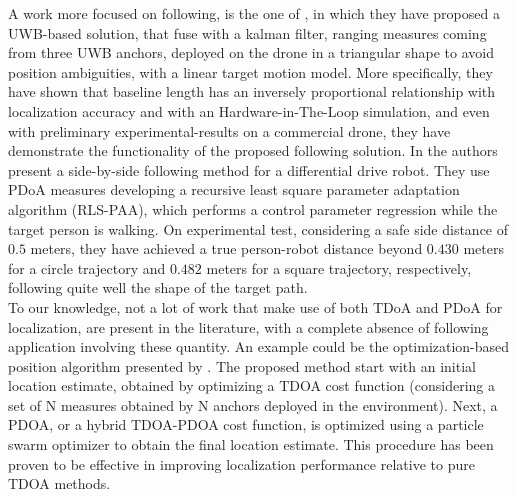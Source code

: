 A work more focused on following, is the one of \citet{Uwbbasedsol}, in which they have proposed a UWB-based solution, that fuse with a kalman filter, ranging measures coming from three UWB anchors, deployed on the drone in a triangular shape to avoid position ambiguities, with a linear target motion model. More specifically, they have shown that baseline length has an inversely proportional relationship with localization accuracy and with an Hardware-in-The-Loop simulation, and even with preliminary experimental-results on a commercial drone, they have demonstrate the functionality of the proposed following solution. In \cite{sidebyside} the authors present a side-by-side following method for a differential drive robot. They use PDoA measures developing a recursive least square parameter adaptation algorithm (RLS-PAA), which performs a control parameter regression while the target person is walking. On experimental test, considering a safe side distance of $0.5$ meters, they have achieved a true person-robot distance beyond $0.430$ meters for a circle trajectory and $0.482$ meters for a square trajectory, respectively, following quite well the shape of the target path.\\
To our knowledge, not a lot of work that make use of both TDoA and PDoA for localization, are present in the literature, with a complete absence of following application involving these quantity. An example could be the optimization-based position algorithm presented by \citet{tdoapdoa_optim}. The proposed method start with an initial location estimate, obtained by optimizing a TDOA cost function (considering a set of N measures obtained by N anchors deployed in the environment). Next, a PDOA, or a hybrid TDOA-PDOA cost function, is optimized using a particle swarm optimizer to obtain the final location estimate. This procedure has been proven to be effective in improving localization performance relative to pure TDOA methods.\\

